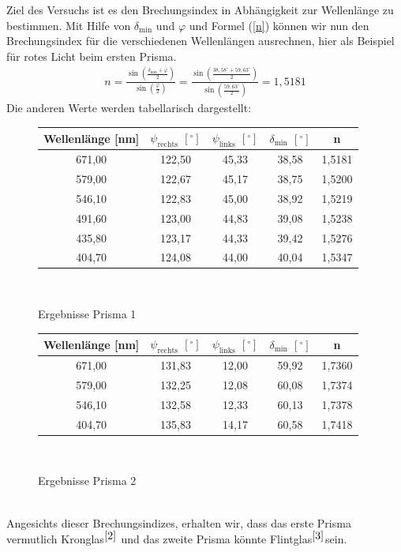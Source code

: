 \documentclass[fontsize=12pt]{scrartcl}
\begin{document}
Ziel des Versuchs ist es den Brechungsindex in Abhängigkeit zur Wellenlänge zu bestimmen.
Mit Hilfe von $\delta_{\text{min}}$ und $\varphi$ und Formel (\ref{n}) können wir nun den Brechungsindex für die verschiedenen Wellenlängen ausrechnen, hier als Beispiel für rotes Licht beim ersten Prisma.
\begin{align*}
n=\frac{\sin(\frac{\delta_{\text{min}} + \varphi}{2 })}{\sin( \frac{\varphi}{2})} =\frac{\sin(\frac{38,58^{\circ} + 59,63^{\circ}}{2 })}{\sin( \frac{59,63^{\circ}}{2})} = 1,5181
\end{align*}
Die anderen Werte werden tabellarisch dargestellt:	
\begin{figure}[h]
\centering
\caption{Ergebnisse Prisma 1}
\begin{tabular}{|c|c|c|c|c|} \hline
Wellenlänge [nm] & $\psi_{\text{rechts}}$ $[^{\circ}]$ & $\psi_{\text{links}}$ $[^{\circ}]$ & $\delta_{\text{min}}$ $[^{\circ}]$ & n \\ \hline
671,00	&122,50	&45,33	&38,58	&1,5181 \\ \hline
579,00	&122,67	&45,17	&38,75	&1,5200\\ \hline
546,10	&122,83	&45,00	&38,92	&1,5219\\ \hline
491,60	&123,00	&44,83	&39,08	&1,5238\\ \hline
435,80	&123,17	&44,33	&39,42	&1,5276\\ \hline
404,70	&124,08	&44,00	&40,04	&1,5347\\ \hline
\end{tabular} \\
\end{figure}
\begin{figure}[h]
\centering
\caption{Ergebnisse Prisma 2}
\begin{tabular}{|c|c|c|c|c|} \hline
Wellenlänge [nm] & $\psi_{\text{rechts}}$ $[^{\circ}]$ & $\psi_{\text{links}}$ $[^{\circ}]$ & $\delta_{\text{min}}$ $[^{\circ}]$ & n  \\ \hline
671,00	&131,83	&12,00	&59,92	&1,7360\\ \hline
579,00	&132,25	&12,08	&60,08	&1,7374\\ \hline
546,10	&132,58	&12,33	&60,13	&1,7378\\ \hline
404,70	&135,83	&14,17	&60,58	&1,7418\\ \hline
\end{tabular} \\
\end{figure}\\
\noindent
Angesichts dieser Brechungsindizes, erhalten wir, dass das erste Prisma vermutlich Kronglas$^{\cite{2}}$ und das zweite Prisma könnte Flintglas$^{\cite{3}}$sein.
\end{document}
